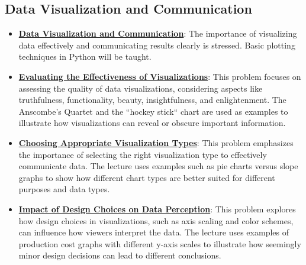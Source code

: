 \documentclass{article}%
\begin{document}
\subsection{Data Visualization and Communication}%
\label{subsec:DataVisualizationandCommunication}%
\begin{itemize}[leftmargin=*]%
\item \href{https://purdue.brightspace.com/d2l/common/assets/pdfjs-d2l-dist/1.0.14-legacy/web/viewer.html?file=\%2Fcontent\%2Fenforced\%2F1095465-WL.202510.CS24200.LE1\%2F01L1-introduction.pdf\%3Fou\%3D1095465\&lang=en-us\&container=d2l-fileviewer-rendered-pdf\&fullscreen=d2l-fileviewer-rendered-pdf-dialog\&height=667#page=4}{\textbf{Data Visualization and Communication}}: The importance of visualizing data effectively and communicating results clearly is stressed. Basic plotting techniques in Python will be taught.%
\item \href{https://purdue.brightspace.com/d2l/common/assets/pdfjs-d2l-dist/1.0.14-legacy/web/viewer.html?file=\%2Fcontent\%2Fenforced\%2F1095465-WL.202510.CS24200.LE1\%2F09L1-IntroToVis.pdf\%3Fou\%3D1095465\&lang=en-us\&container=d2l-fileviewer-rendered-pdf\&fullscreen=d2l-fileviewer-rendered-pdf-dialog\&height=667#page=3}{\textbf{Evaluating the Effectiveness of Visualizations}}: This problem focuses on assessing the quality of data visualizations, considering aspects like truthfulness, functionality, beauty, insightfulness, and enlightenment. The Anscombe's Quartet and the ``hockey stick`` chart are used as examples to illustrate how visualizations can reveal or obscure important information.%
\item \href{https://purdue.brightspace.com/d2l/common/assets/pdfjs-d2l-dist/1.0.14-legacy/web/viewer.html?file=\%2Fcontent\%2Fenforced\%2F1095465-WL.202510.CS24200.LE1\%2F09L1-IntroToVis.pdf\%3Fou\%3D1095465\&lang=en-us\&container=d2l-fileviewer-rendered-pdf\&fullscreen=d2l-fileviewer-rendered-pdf-dialog\&height=667#page=5}{\textbf{Choosing Appropriate Visualization Types}}: This problem emphasizes the importance of selecting the right visualization type to effectively communicate data. The lecture uses examples such as pie charts versus slope graphs to show how different chart types are better suited for different purposes and data types.%
\item \href{https://purdue.brightspace.com/d2l/common/assets/pdfjs-d2l-dist/1.0.14-legacy/web/viewer.html?file=\%2Fcontent\%2Fenforced\%2F1095465-WL.202510.CS24200.LE1\%2F09L1-IntroToVis.pdf\%3Fou\%3D1095465\&lang=en-us\&container=d2l-fileviewer-rendered-pdf\&fullscreen=d2l-fileviewer-rendered-pdf-dialog\&height=667#page=18}{\textbf{Impact of Design Choices on Data Perception}}: This problem explores how design choices in visualizations, such as axis scaling and color schemes, can influence how viewers interpret the data. The lecture uses examples of production cost graphs with different y-axis scales to illustrate how seemingly minor design decisions can lead to different conclusions.%

\end{itemize}
\end{document}
